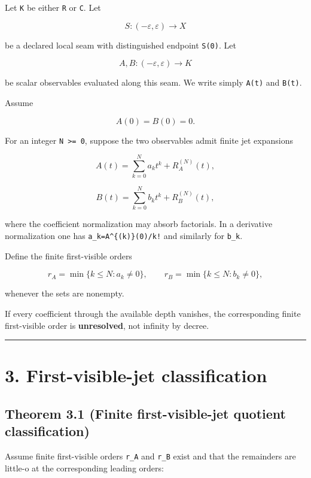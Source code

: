 Let \texttt{K} be either \texttt{R} or \texttt{C}. Let

\[
S:(-\varepsilon,\varepsilon)\to X
\]

be a declared local seam with distinguished endpoint \texttt{S(0)}. Let

\[
A,B:(-\varepsilon,\varepsilon)\to K
\]

be scalar observables evaluated along this seam. We write simply \texttt{A(t)} and
\texttt{B(t)}.

Assume

\[
A(0)=B(0)=0.
\tag{2.1}
\]

For an integer \texttt{N\ \textgreater{}=\ 0}, suppose the two observables admit finite jet
expansions

\[
A(t)=\sum_{k=0}^{N} a_k t^k + R_A^{(N)}(t),
\tag{2.2}
\]

\[
B(t)=\sum_{k=0}^{N} b_k t^k + R_B^{(N)}(t),
\tag{2.3}
\]

where the coefficient normalization may absorb factorials. In a derivative
normalization one has \texttt{a\_k=A\^{}\{(k)\}(0)/k!} and similarly for \texttt{b\_k}.

Define the finite first-visible orders

\[
r_A=\min\{k\le N:a_k\ne0\},
\qquad
r_B=\min\{k\le N:b_k\ne0\},
\tag{2.4}
\]

whenever the sets are nonempty.

If every coefficient through the available depth vanishes, the corresponding
finite first-visible order is \textbf{unresolved}, not infinity by decree.

\begin{center}\rule{0.5\linewidth}{0.5pt}\end{center}

\hypertarget{first-visible-jet-classification}{%
\section{3. First-visible-jet classification}\label{first-visible-jet-classification}}

\hypertarget{theorem-3.1-finite-first-visible-jet-quotient-classification}{%
\subsection{Theorem 3.1 (Finite first-visible-jet quotient classification)}\label{theorem-3.1-finite-first-visible-jet-quotient-classification}}

Assume finite first-visible orders \texttt{r\_A} and \texttt{r\_B} exist and that the remainders
are little-o at the corresponding leading orders:

